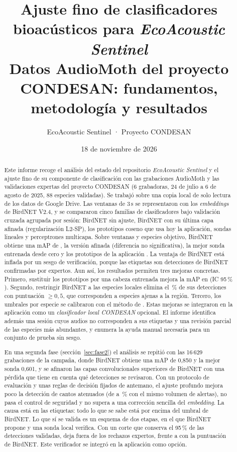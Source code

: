 \documentclass[11pt,a4paper]{article}
\title{Ajuste fino de clasificadores bioacústicos para \textit{EcoAcoustic Sentinel}\\[4pt]
\large Datos AudioMoth del proyecto CONDESAN: fundamentos, metodología y resultados}
\author{EcoAcoustic Sentinel · Proyecto CONDESAN}
\date{18 de noviembre de 2026}
\begin{document}
\maketitle

\begin{abstract}
\noindent
Este informe recoge el análisis del estado del repositorio \textit{EcoAcoustic Sentinel} y el ajuste fino de su
componente de clasificación con las grabaciones AudioMoth y las validaciones expertas del proyecto CONDESAN
(6 grabadoras, 24 de julio a 6 de agosto de 2025, 88 especies validadas). Se trabajó sobre una copia local de solo lectura
de los datos de Google Drive. Las ventanas de 3\,s se representaron con los \emph{embeddings} de BirdNET V2.4, y se compararon
cinco familias de clasificadores bajo validación cruzada agrupada por sesión: BirdNET sin ajuste, BirdNET con su última
capa afinada (regularización L2-SP), los prototipos coseno que usa hoy la aplicación, sondas lineales y perceptrones multicapa.
Sobre \nWindows{} ventanas y \nSpecies{} especies objetivo, BirdNET obtiene una mAP de \mapBirdnet{}, la versión afinada \mapFT{}
(diferencia no significativa), la mejor sonda entrenada desde cero \mapLinear{} y los prototipos de la aplicación \mapProto.
La ventaja de BirdNET está inflada por un sesgo de verificación, porque las etiquetas son detecciones de BirdNET confirmadas por expertos.
Aun así, los resultados permiten tres mejoras concretas.
Primero, sustituir los prototipos por una cabeza entrenada mejora la mAP en \deltaLinearVsProto{} (IC 95\,\% \ciLinearVsProto).
Segundo, restringir BirdNET a las especies locales elimina el \nonlocalHalf\,\% de sus detecciones con puntuación $\geq 0{,}5$, que corresponden a especies ajenas a la región.
Tercero, los umbrales por especie se calibraron con el método de \citet{wood2024guidelines}.
Estas mejoras se integraron en la aplicación como un \emph{clasificador local CONDESAN} opcional.
El informe identifica además una sesión cuyos audios no corresponden a sus etiquetas y una revisión parcial
de las especies más abundantes, y enumera la ayuda manual necesaria para un conjunto de prueba sin sesgo.

\smallskip\noindent
En una segunda fase (sección~\ref{sec:fase2}) el análisis se repitió con las 16\,629 grabaciones de la campaña, donde BirdNET obtiene una mAP de 0,850
y la mejor sonda 0,601, y se afinaron las capas convolucionales superiores de BirdNET con una pérdida que tiene en cuenta qué detecciones se revisaron.
Con un protocolo de evaluación y unas reglas de decisión fijados de antemano, el ajuste profundo mejora poco la detección de cantos atenuados
(de \deepAttBirdnet{} a \deepAttDeep\,\% con el mismo volumen de alertas), no pasa el control de seguridad y no supera a una corrección sencilla del
\emph{embedding}.
La causa está en las etiquetas: todo lo que se sabe está por encima del umbral de BirdNET. Lo que sí se valida es un esquema de dos etapas, en el que
BirdNET propone y una sonda local verifica. Con un corte que conserva el 95\,\% de las detecciones validadas, deja fuera \deepRejRemovedTwoStage{} de los
\deepRejections{} rechazos expertos, frente a \deepRejRemovedBirdnet{} con la puntuación de BirdNET. Este verificador se integró en la aplicación como opción.
\end{abstract}
\end{document}
